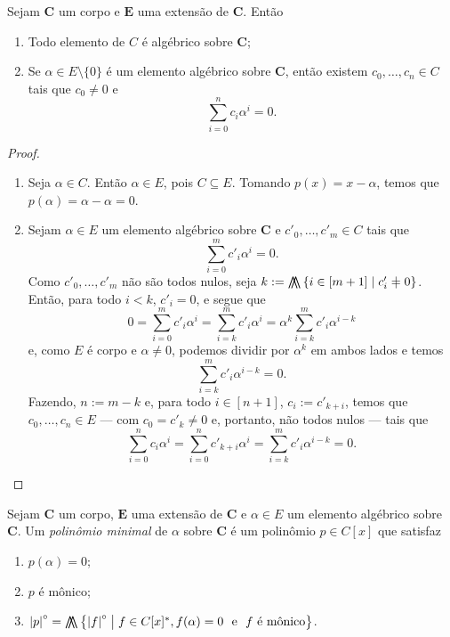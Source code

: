 \begin{proposition}
	Sejam $\bm C$ um corpo e $\bm E$ uma extensão de $\bm C$. Então
	\begin{enumerate}
	\item Todo elemento de $C$ é algébrico sobre $\bm C$;
	\item Se $\alpha \in E \setminus \{0\}$ é um elemento algébrico sobre $\bm C$, então existem $c_0,\ldots,c_n \in C$ tais que $c_0 \neq 0$ e
	\begin{equation*}
	\sum_{i=0}^n c_i\alpha^i = 0.
	\end{equation*}
	\end{enumerate}
\end{proposition}
\begin{proof}
	\begin{enumerate}
	\item Seja $\alpha \in C$. Então $\alpha \in E$, pois $C \subseteq E$. Tomando $p(x)=x-\alpha$, temos que $p(\alpha)=\alpha-\alpha=0$.
	\item Sejam $\alpha \in E$ um elemento algébrico sobre $\bm C$ e $c'_0,\ldots,c'_m \in C$ tais que
	\begin{equation*}
	\sum_{i=0}^m c'_i\alpha^i = 0.
	\end{equation*}
Como $c'_0, \ldots,c'_m$ não são todos nulos, seja $k := \min\set{i \in [m+1]}{c'_i \neq 0}$. Então, para todo $i < k$, $c'_i = 0$, e segue que
	\begin{equation*}
	0 = \sum_{i=0}^m c'_i\alpha^i = \sum_{i=k}^m c'_i\alpha^i = \alpha^k \sum_{i=k}^m c'_i\alpha^{i-k}
	\end{equation*}
e, como $E$ é corpo e $\alpha \neq 0$, podemos dividir por $\alpha^k$ em ambos lados e temos
	\begin{equation*}
	\sum_{i=k}^m c'_i\alpha^{i-k} = 0.
	\end{equation*}
Fazendo, $n := m-k$ e, para todo $i \in [n+1]$, $c_i := c'_{k+i}$, temos que $c_0,\ldots,c_n \in E$ — com $c_0 = c'_k \neq 0$ e, portanto, não todos nulos — tais que
	\begin{equation*}
	\sum_{i=0}^n c_i\alpha^i = \sum_{i=0}^n c'_{k+i}\alpha^i = \sum_{i=k}^m c'_i\alpha^{i-k} = 0.
	\end{equation*}
	\end{enumerate}
\end{proof}

\begin{definition}
	Sejam $\bm C$ um corpo, $\bm E$ uma extensão de $\bm C$ e $\alpha \in E$ um elemento algébrico sobre $\bm C$. Um \emph{polinômio minimal} de $\alpha$ sobre $\bm C$ é um polinômio $p \in C[x]$ que satisfaz
	\begin{enumerate}
	\item $p(\alpha) = 0$;
	\item $p$ é mônico;
	\item $\grau{p} = \min\set{\grau{f}}{f \in C[x]^*, f(\alpha)=0 \text{\ \ e\ \ } f \text{\ é mônico}}$.
	\end{enumerate}
\end{definition}

